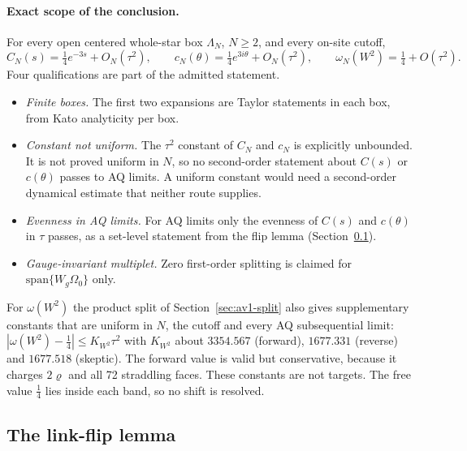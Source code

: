 \paragraph{Exact scope of the conclusion.}
For every open centered whole-star box $\Lambda_N$, $N\ge2$, and every
on-site cutoff,
\begin{equation}
 C_N(s)=\tfrac14e^{-3s}+O_N(\tau^2),\qquad
 c_N(\theta)=\tfrac14e^{3i\theta}+O_N(\tau^2),\qquad
 \omega_N(W^2)=\tfrac14+O(\tau^2).
 \label{eq:aw1-parity-conclusion}
\end{equation}
Four qualifications are part of the admitted statement.
\begin{itemize}
\item \emph{Finite boxes.} The first two expansions are Taylor statements in
each box, from Kato analyticity per box.
\item \emph{Constant not uniform.} The $\tau^2$ constant of $C_N$ and $c_N$ is
explicitly unbounded. It is not proved uniform in $N$, so no second-order
statement about $C(s)$ or $c(\theta)$ passes to AQ limits. A uniform constant
would need a second-order dynamical estimate that neither route supplies.
\item \emph{Evenness in AQ limits.} For AQ limits only the evenness of $C(s)$
and $c(\theta)$ in $\tau$ passes, as a set-level statement from the flip
lemma (Section~\ref{sec:aw1-flip}).
\item \emph{Gauge-invariant multiplet.} Zero first-order splitting is claimed
for $\mathrm{span}\{W_g\Omega_0\}$ only.
\end{itemize}
For $\omega(W^2)$ the product split of Section~\ref{sec:av1-split} also gives
supplementary constants that are uniform in $N$, the cutoff and every AQ
subsequential limit: $|\omega(W^2)-\tfrac14|\le K_{W^2}\tau^2$ with $K_{W^2}$
about $3354.567$ (forward), $1677.331$ (reverse) and $1677.518$ (skeptic). The
forward value is valid but conservative, because it charges $2\varrho$ and all
72 straddling faces. These constants are not targets. The free value
$\tfrac14$ lies inside each band, so no shift is resolved.

\subsection{The link-flip lemma}
\label{sec:aw1-flip}
